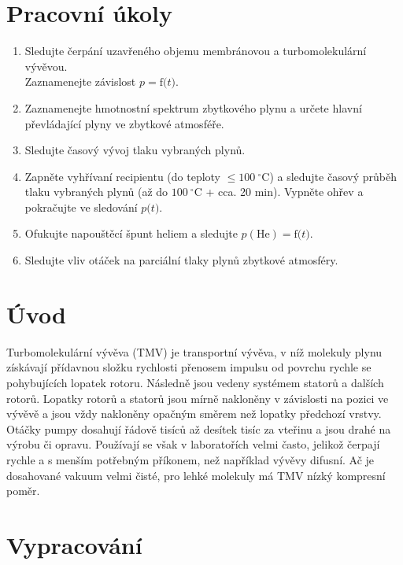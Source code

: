 \documentclass[english]{article}
\newcommand{\unit}[1]{~\mathrm{#1}}
\newcommand{\degc}{^\circ C}
\begin{document}


\setlength{\parindent}{0.5cm}

\section{Pracovní úkoly}

\begin{enumerate}
	\item Sledujte čerpání uzavřeného objemu membránovou a turbomolekulární vývěvou. \\Zaznamenejte závislost $p = \mathrm{f(}t\mathrm{)}$.
	\item Zaznamenejte hmotnostní spektrum zbytkového plynu a určete hlavní převládající plyny ve zbytkové atmosféře.
	\item Sledujte časový vývoj tlaku vybraných plynů.
	\item Zapněte vyhřívaní recipientu (do teploty $\leq 100\unit{\degc}$) a sledujte časový průběh tlaku vybraných plynů (až do $100\unit{\degc}$ + cca. 20 min). Vypněte ohřev a pokračujte ve sledování $p\mathrm{(}t\mathrm{)}$.
	\item Ofukujte napouštěcí špunt heliem a sledujte $p\mathrm{(He)} = \mathrm{f(}t\mathrm{)}$.
	\item Sledujte vliv otáček na parciální tlaky plynů zbytkové atmosféry.
\end{enumerate}

\section{Úvod}
	Turbomolekulární vývěva (TMV) je transportní vývěva, v níž molekuly plynu získávají přídavnou složku rychlosti přenosem impulsu od povrchu rychle se pohybujících lopatek rotoru. Následně jsou vedeny systémem statorů a dalších rotorů. Lopatky rotorů a statorů jsou mírně nakloněny v závislosti na pozici ve vývěvě a jsou vždy nakloněny opačným směrem než lopatky předchozí vrstvy. Otáčky pumpy dosahují řádově tisíců až desítek tisíc za vteřinu a jsou drahé na výrobu či opravu. Používají se však v laboratořích velmi často, jelikož čerpají rychle a s menším potřebným příkonem, než například vývěvy difusní. Ač je dosahované vakuum velmi čisté, pro lehké molekuly má TMV nízký kompresní poměr.

\section{Vypracování}
\end{document}
